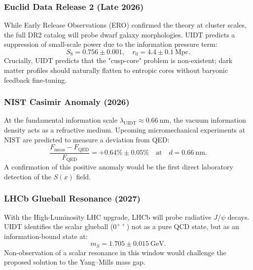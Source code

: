 \subsubsection{Euclid Data Release 2 (Late 2026)}
While Early Release Observations (ERO) confirmed the theory at cluster scales, the full DR2 catalog will probe dwarf galaxy morphologies. UIDT predicts a suppression of small-scale power due to the information pressure term:
\begin{equation}
    S_8 = 0.756 \pm 0.001, \quad r_0 = 4.4 \pm 0.1~\mathrm{Mpc}.
\end{equation}
Crucially, UIDT predicts that the "cusp-core" problem is non-existent; dark matter profiles should naturally flatten to entropic cores without baryonic feedback fine-tuning.

\subsubsection{NIST Casimir Anomaly (2026)}
At the fundamental information scale $\lambda_{\mathrm{UIDT}} \approx 0.66~\mathrm{nm}$, the vacuum information density acts as a refractive medium. Upcoming micromechanical experiments at NIST are predicted to measure a deviation from QED:
\begin{equation}
    \frac{F_{\mathrm{meas}} - F_{\mathrm{QED}}}{F_{\mathrm{QED}}} = +0.64\% \pm 0.05\% \quad \text{at} \quad d = 0.66~\mathrm{nm}.
\end{equation}
A confirmation of this positive anomaly would be the first direct laboratory detection of the $S(x)$ field.

\subsubsection{LHCb Glueball Resonance (2027)}
With the High-Luminosity LHC upgrade, LHCb will probe radiative $J/\psi$ decays. UIDT identifies the scalar glueball ($0^{++}$) not as a pure QCD state, but as an information-bound state at:
\begin{equation}
    m_S = 1.705 \pm 0.015~\mathrm{GeV}.
\end{equation}
Non-observation of a scalar resonance in this window would challenge the proposed solution to the Yang--Mills mass gap.\citet{Riess1998}